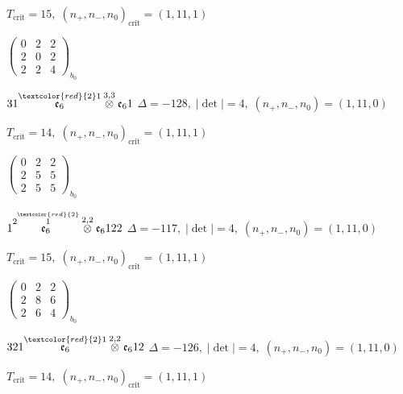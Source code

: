 \documentclass[10pt]{article}
\begin{document}
\hspace{1em}$T_{\text{crit}}=15,\; (n_+,n_-,n_0)_{\text{crit}}=(1,11,1)$

\hspace{2em}$\left(\begin{smallmatrix}0 & 2 & 2 \\ 2 & 0 & 2 \\ 2 & 2 & 4\end{smallmatrix}\right)_{\!b_0}$

\smallskip

$31\overset{\textcolor{red}{2}1}{\mathfrak{e}_6}\overset{3,3}{\otimes}\mathfrak{e}_61$ \quad $\Delta=-128,\; |\det|=4,\; (n_+,n_-,n_0)=(1,11,0)$

\hspace{1em}$T_{\text{crit}}=14,\; (n_+,n_-,n_0)_{\text{crit}}=(1,11,1)$

\hspace{2em}$\left(\begin{smallmatrix}0 & 2 & 2 \\ 2 & 5 & 5 \\ 2 & 5 & 5\end{smallmatrix}\right)_{\!b_0}$

\smallskip

$1\overset{2\overset{\textcolor{red}{2}}{1}}{\mathfrak{e}_6}\overset{2,2}{\otimes}\mathfrak{e}_6122$ \quad $\Delta=-117,\; |\det|=4,\; (n_+,n_-,n_0)=(1,11,0)$

\hspace{1em}$T_{\text{crit}}=15,\; (n_+,n_-,n_0)_{\text{crit}}=(1,11,1)$

\hspace{2em}$\left(\begin{smallmatrix}0 & 2 & 2 \\ 2 & 8 & 6 \\ 2 & 6 & 4\end{smallmatrix}\right)_{\!b_0}$

\smallskip

$321\overset{\textcolor{red}{2}1}{\mathfrak{e}_6}\overset{2,2}{\otimes}\mathfrak{e}_612$ \quad $\Delta=-126,\; |\det|=4,\; (n_+,n_-,n_0)=(1,11,0)$

\hspace{1em}$T_{\text{crit}}=14,\; (n_+,n_-,n_0)_{\text{crit}}=(1,11,1)$
\end{document}
